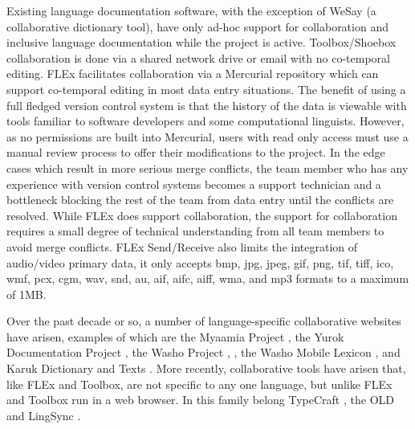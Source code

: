 \documentclass[11pt]{article}
\begin{document}
Existing language documentation software,  with the exception of WeSay (a collaborative dictionary tool), have only ad-hoc support for collaboration and inclusive language documentation while the project is active. Toolbox/Shoebox collaboration is done via a shared network drive or email with no co-temporal editing. 
FLEx  facilitates collaboration via a Mercurial repository \cite{FLExSendReceive:2013:Online} which can  support co-temporal editing in most data entry situations. 
The benefit of using a full fledged version control system is that the history of the data is viewable with tools familiar to software developers and some computational linguists. 
However, as no permissions are built into Mercurial, users with read only access must use a manual review process to offer their modifications to the project. 
In the edge cases which result in more serious merge conflicts, the team member who has any experience with version control systems becomes a support technician and a bottleneck blocking the rest of the team from data entry until the conflicts are resolved.
While FLEx does support collaboration, the support for collaboration requires a small degree of technical understanding from all team members to avoid merge conflicts.
FLEx Send/Receive also limits the integration of audio/video primary data, it only accepts bmp, jpg, jpeg, gif, png, tif, tiff, ico, wmf, pcx,  cgm, wav, snd, au, aif, aifc, aiff, wma, and mp3 formats to a maximum of 1MB.

 
% 


Over the past decade or so, a number of language-specific collaborative 
websites have arisen, examples of which are the Myaamia Project
\cite{Myaamia:2001}, the Yurok Documentation Project \cite{Yurok:2001:Online},
the Washo Project \cite{Washo:2005:Online}, \cite{Cihlar:2008}, the Washo
Mobile Lexicon \cite{WashoMobile:2008:Online}, and Karuk Dictionary and Texts
\cite{Karuk:2009:Online}. 
More recently, collaborative  tools have arisen that, like FLEx and Toolbox, are not specific to any one language, but unlike FLEx and Toolbox run in a web browser.
In this family belong TypeCraft \cite{Beermann:2012}, the OLD \cite{dunham2014} and LingSync \cite{lingsync:2012}.
\end{document}
